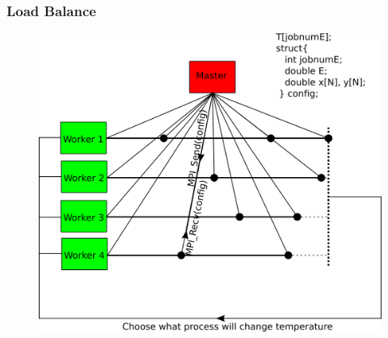 \documentclass{beamer}
\begin{document}
\begin{frame}
  \frametitle{Load Balance}

  \begin{figure}[h!]
    \centering
    \includegraphics[scale=0.6]{Imagens/loadBalance.png}
  \end{figure}
\end{frame}
\end{document}
